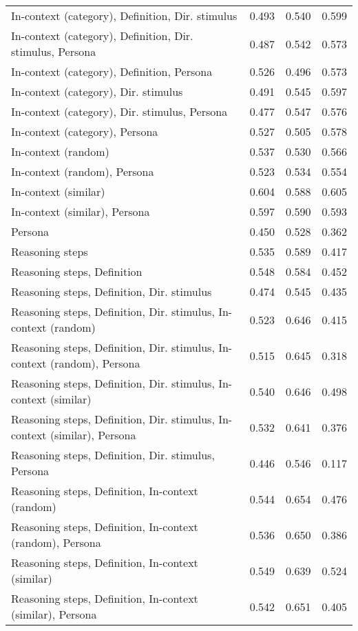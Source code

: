 \begin{table*}
\begin{tabular}{lrrr}
        In-context (category), Definition, Dir. stimulus & 0.493 & 0.540 & 0.599 \\
        In-context (category), Definition, Dir. stimulus, Persona & 0.487 & 0.542 & 0.573 \\
        In-context (category), Definition, Persona & 0.526 & 0.496 & 0.573 \\
        In-context (category), Dir. stimulus & 0.491 & 0.545 & 0.597 \\
        In-context (category), Dir. stimulus, Persona & 0.477 & 0.547 & 0.576 \\
        In-context (category), Persona & 0.527 & 0.505 & 0.578 \\
        In-context (random) & 0.537 & 0.530 & 0.566 \\
        In-context (random), Persona & 0.523 & 0.534 & 0.554 \\
        In-context (similar) & 0.604 & 0.588 & 0.605 \\
        In-context (similar), Persona & 0.597 & 0.590 & 0.593 \\
        Persona & 0.450 & 0.528 & 0.362 \\
        Reasoning steps & 0.535 & 0.589 & 0.417 \\
        Reasoning steps, Definition & 0.548 & 0.584 & 0.452 \\
        Reasoning steps, Definition, Dir. stimulus & 0.474 & 0.545 & 0.435 \\
        Reasoning steps, Definition, Dir. stimulus, In-context (random) & 0.523 & 0.646 & 0.415 \\
        Reasoning steps, Definition, Dir. stimulus, In-context (random), Persona & 0.515 & 0.645 & 0.318 \\
        Reasoning steps, Definition, Dir. stimulus, In-context (similar) & 0.540 & 0.646 & 0.498 \\
        Reasoning steps, Definition, Dir. stimulus, In-context (similar), Persona & 0.532 & 0.641 & 0.376 \\
        Reasoning steps, Definition, Dir. stimulus, Persona & 0.446 & 0.546 & 0.117 \\
        Reasoning steps, Definition, In-context (random) & 0.544 & 0.654 & 0.476 \\
        Reasoning steps, Definition, In-context (random), Persona & 0.536 & 0.650 & 0.386 \\
        Reasoning steps, Definition, In-context (similar) & 0.549 & 0.639 & 0.524 \\
        Reasoning steps, Definition, In-context (similar), Persona & 0.542 & 0.651 & 0.405 \\

\end{tabular}
\end{table*}
